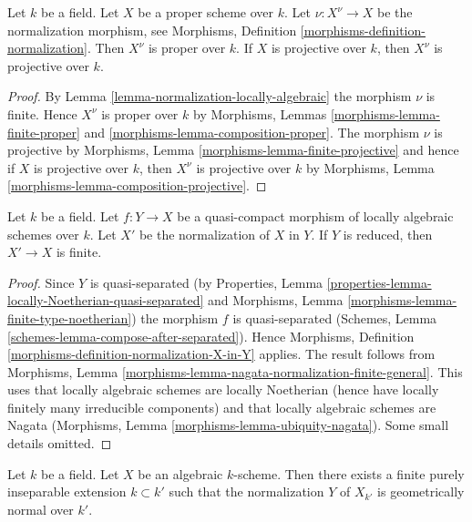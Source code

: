 \begin{lemma}
\label{lemma-normalize-projective}
Let $k$ be a field. Let $X$ be a proper scheme over $k$.
Let $\nu : X^\nu \to X$ be the normalization morphism, see
Morphisms, Definition \ref{morphisms-definition-normalization}.
Then $X^\nu$ is proper over $k$. If $X$ is projective over $k$,
then $X^\nu$ is projective over $k$.
\end{lemma}

\begin{proof}
By Lemma \ref{lemma-normalization-locally-algebraic} the morphism $\nu$
is finite. Hence $X^\nu$ is proper over $k$ by
Morphisms, Lemmas \ref{morphisms-lemma-finite-proper} and
\ref{morphisms-lemma-composition-proper}.
The morphism $\nu$ is projective by
Morphisms, Lemma \ref{morphisms-lemma-finite-projective}
and hence if $X$ is projective over $k$, then $X^\nu$ is projective over $k$
by Morphisms, Lemma \ref{morphisms-lemma-composition-projective}.
\end{proof}

\begin{lemma}
\label{lemma-relative-normalization-finite}
Let $k$ be a field. Let $f : Y \to X$ be a quasi-compact
morphism of locally algebraic schemes over $k$. Let $X'$
be the normalization of $X$ in $Y$. If $Y$ is reduced, then
$X' \to X$ is finite.
\end{lemma}

\begin{proof}
Since $Y$ is quasi-separated (by
Properties, Lemma \ref{properties-lemma-locally-Noetherian-quasi-separated} and
Morphisms, Lemma \ref{morphisms-lemma-finite-type-noetherian})
the morphism $f$ is quasi-separated
(Schemes, Lemma \ref{schemes-lemma-compose-after-separated}).
Hence Morphisms, Definition \ref{morphisms-definition-normalization-X-in-Y}
applies. The result follows from Morphisms, Lemma
\ref{morphisms-lemma-nagata-normalization-finite-general}.
This uses that locally algebraic schemes are locally Noetherian
(hence have locally finitely many irreducible components)
and that locally algebraic schemes are Nagata
(Morphisms, Lemma \ref{morphisms-lemma-ubiquity-nagata}).
Some small details omitted.
\end{proof}

\begin{lemma}
\label{lemma-finite-extension-geometrically-normal}
Let $k$ be a field. Let $X$ be an algebraic $k$-scheme.
Then there exists a finite purely inseparable extension $k \subset k'$
such that the normalization $Y$ of $X_{k'}$ is geometrically normal over $k'$.
\end{lemma}

